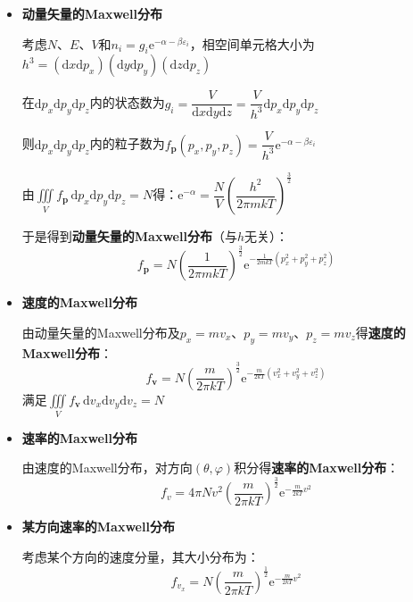 \documentclass{beamer}
\renewcommand{\bm}{\symbf}
\renewcommand\epsilon{\varepsilon}
\newenvironment{slide}{
    \begin{frame}{\bfseries{\sectiontitle}}
}{
    \end{frame}
}
\begin{document}
\begin{slide}
    \begin{itemize}
        \item \textbf{动量矢量的Maxwell分布}

        考虑$N$、$E$、$V$和$n_i=g_i\mathrm{e}^{-\alpha-\beta\epsilon_i}$，相空间单元格大小为$h^3=(\mathrm{d}x\mathrm{d}p_x)(\mathrm{d}y\mathrm{d}p_y)(\mathrm{d}z\mathrm{d}p_z)$

        在$\mathrm{d}p_x\mathrm{d}p_y\mathrm{d}p_z$内的状态数为$g_i=\dfrac{V}{\mathrm{d}x\mathrm{d}y\mathrm{d}z}=\dfrac{V}{h^3}\mathrm{d}p_x\mathrm{d}p_y\mathrm{d}p_z$

        则$\mathrm{d}p_x\mathrm{d}p_y\mathrm{d}p_z$内的粒子数为$f_{\bm{p}}(p_x,p_y,p_z)=\dfrac{V}{h^3}\mathrm{e}^{-\alpha-\beta\epsilon_i}$

        由${\displaystyle\iiint\limits_V f_{\bm{p}}\,\mathrm{d}p_x\mathrm{d}p_y\mathrm{d}p_z}=N$得：$\mathrm{e}^{-\alpha}=\dfrac{N}{V}\left(\dfrac{h^2}{2\pi mkT}\right)^{\tfrac{3}{2}}$

        于是得到\textbf{动量矢量的Maxwell分布}（与$h$无关）：
        \[
            \boxed{
            f_{\bm{p}} = N\left(\dfrac{1}{2\pi mkT}\right)^{\tfrac{3}{2}}\mathrm{e}^{-\tfrac{1}{2mkT}(p_x^2+p_y^2+p_z^2)}
            }
        \]
    \end{itemize}
\end{slide}

\begin{slide}
    \begin{itemize}
        \item \textbf{速度的Maxwell分布}

        由动量矢量的Maxwell分布及$p_x=mv_x$、$p_y=mv_y$、$p_z=mv_z$得\textbf{速度的Maxwell分布}：
        \[
            \boxed{
            f_{\bm{v}} = N\left(\dfrac{m}{2\pi kT}\right)^{\tfrac{3}{2}}\mathrm{e}^{-\tfrac{m}{2kT}(v_x^2+v_y^2+v_z^2)}
            }
        \]
        满足${\displaystyle\iiint\limits_V f_{\bm{v}}\,\mathrm{d}v_x\mathrm{d}v_y\mathrm{d}v_z}=N$
    \end{itemize}
\end{slide}

\begin{slide}
    \begin{itemize}
        \item \textbf{速率的Maxwell分布}

        由速度的Maxwell分布，对方向$(\theta,\varphi)$积分得\textbf{速率的Maxwell分布}：
        \[
            \boxed{
            f_v = 4\pi Nv^2\left(\dfrac{m}{2\pi kT}\right)^{\tfrac{3}{2}}\mathrm{e}^{-\tfrac{m}{2kT}v^2}
            }
        \]
        \item \textbf{某方向速率的Maxwell分布}

        考虑某个方向的速度分量，其大小分布为：
        \[
            f_{v_x} = N\left(\dfrac{m}{2\pi kT}\right)^{\tfrac{1}{2}}\mathrm{e}^{-\tfrac{m}{2kT}v^2}
        \]
    \end{itemize}
\end{slide}
\end{document}
